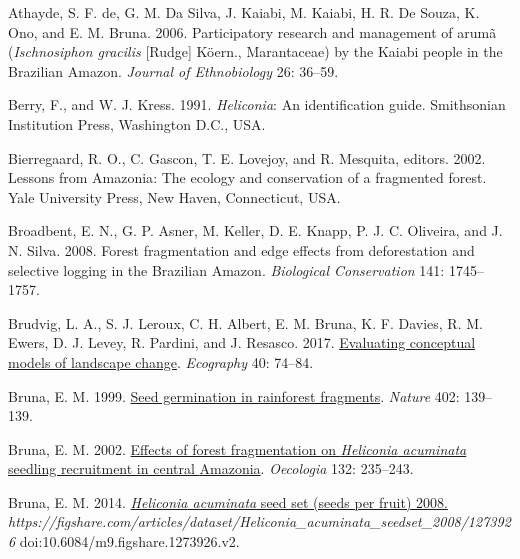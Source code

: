 \documentclass[
  12pt,
  man, donotrepeattitle]{apa6}
\newlength{\cslhangindent}
\newlength{\cslentryspacingunit} %
\newenvironment{CSLReferences}[2] %
 {%
  \setlength{\parindent}{0pt}
  \ifodd #1
  \let\oldpar\par
  \def\par{\hangindent=\cslhangindent\oldpar}
  \fi
  \setlength{\parskip}{#2\cslentryspacingunit}
 }%
 {}
\begin{document}
\hypertarget{refs}{}
\begin{CSLReferences}{1}{0}
\leavevmode{}%
Athayde, S. F. de, G. M. Da Silva, J. Kaiabi, M. Kaiabi, H. R. De Souza, K. Ono, and E. M. Bruna. 2006. Participatory research and management of arumã (\emph{{Ischnosiphon} gracilis} {[}{Rudge}{]} {Köern}., {Marantaceae}) by the {Kaiabi} people in the {Brazilian} {Amazon}. \emph{Journal of Ethnobiology} 26: 36--59.

\leavevmode{}%
Berry, F., and W. J. Kress. 1991. \emph{Heliconia}: An identification guide. Smithsonian Institution Press, Washington D.C., USA.

\leavevmode{}%
Bierregaard, R. O., C. Gascon, T. E. Lovejoy, and R. Mesquita, editors. 2002. Lessons from {Amazonia}: The ecology and conservation of a fragmented forest. Yale University Press, New Haven, Connecticut, USA.

\leavevmode{}%
Broadbent, E. N., G. P. Asner, M. Keller, D. E. Knapp, P. J. C. Oliveira, and J. N. Silva. 2008. Forest fragmentation and edge effects from deforestation and selective logging in the {Brazilian} {Amazon}. \emph{Biological Conservation} 141: 1745--1757.

\leavevmode{}%
Brudvig, L. A., S. J. Leroux, C. H. Albert, E. M. Bruna, K. F. Davies, R. M. Ewers, D. J. Levey, R. Pardini, and J. Resasco. 2017. \href{https://doi.org/10.1111/ecog.02543}{Evaluating conceptual models of landscape change}. \emph{Ecography} 40: 74--84.

\leavevmode{}%
Bruna, E. M. 1999. \href{https://doi.org/10.1038/45963}{Seed germination in rainforest fragments}. \emph{Nature} 402: 139--139.

\leavevmode{}%
Bruna, E. M. 2002. \href{https://doi.org/10.1007/s00442-002-0956-y}{Effects of forest fragmentation on \emph{{Heliconia} acuminata} seedling recruitment in central {Amazonia}}. \emph{Oecologia} 132: 235--243.

\leavevmode{}%
Bruna, E. M. 2014. \href{https://doi.org/10.6084/m9.figshare.1273926.v2}{\emph{{Heliconia} acuminata} seed set (seeds per fruit) 2008.} \emph{https://figshare.com/articles/dataset/Heliconia\_acuminata\_seedset\_2008/1273926} doi:10.6084/m9.figshare.1273926.v2.


\end{CSLReferences}
\end{document}
